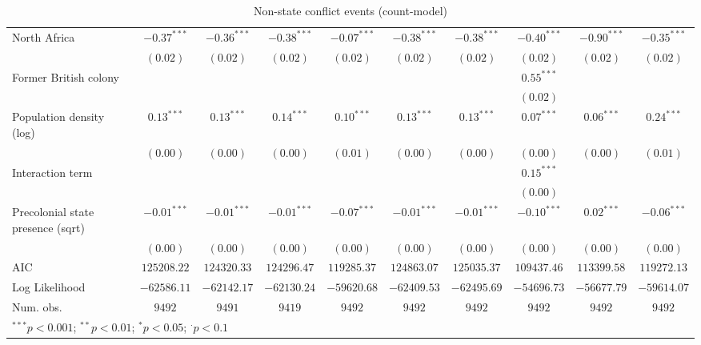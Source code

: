 \begin{sidewaystable}
\begin{center}
{\begin{tabular}{l c c c c c c c c c}
North Africa                          & $-0.37^{***}$ & $-0.36^{***}$ & $-0.38^{***}$ & $-0.07^{***}$ & $-0.38^{***}$ & $-0.38^{***}$ & $-0.40^{***}$ & $-0.90^{***}$ & $-0.35^{***}$ \\
                                      & $(0.02)$      & $(0.02)$      & $(0.02)$      & $(0.02)$      & $(0.02)$      & $(0.02)$      & $(0.02)$      & $(0.02)$      & $(0.02)$      \\
Former British colony                 &               &               &               &               &               &               & $0.55^{***}$  &               &               \\
                                      &               &               &               &               &               &               & $(0.02)$      &               &               \\
Population density (log)              & $0.13^{***}$  & $0.13^{***}$  & $0.14^{***}$  & $0.10^{***}$  & $0.13^{***}$  & $0.13^{***}$  & $0.07^{***}$  & $0.06^{***}$  & $0.24^{***}$  \\
                                      & $(0.00)$      & $(0.00)$      & $(0.00)$      & $(0.01)$      & $(0.00)$      & $(0.00)$      & $(0.00)$      & $(0.00)$      & $(0.01)$      \\
Interaction term                      &               &               &               &               &               &               & $0.15^{***}$  &               &               \\
                                      &               &               &               &               &               &               & $(0.00)$      &               &               \\
Precolonial state presence (sqrt)     & $-0.01^{***}$ & $-0.01^{***}$ & $-0.01^{***}$ & $-0.07^{***}$ & $-0.01^{***}$ & $-0.01^{***}$ & $-0.10^{***}$ & $0.02^{***}$  & $-0.06^{***}$ \\
                                      & $(0.00)$      & $(0.00)$      & $(0.00)$      & $(0.00)$      & $(0.00)$      & $(0.00)$      & $(0.00)$      & $(0.00)$      & $(0.00)$      \\
\midrule
AIC                                   & $125208.22$   & $124320.33$   & $124296.47$   & $119285.37$   & $124863.07$   & $125035.37$   & $109437.46$   & $113399.58$   & $119272.13$   \\
Log Likelihood                        & $-62586.11$   & $-62142.17$   & $-62130.24$   & $-59620.68$   & $-62409.53$   & $-62495.69$   & $-54696.73$   & $-56677.79$   & $-59614.07$   \\
Num. obs.                             & $9492$        & $9491$        & $9419$        & $9492$        & $9492$        & $9492$        & $9492$        & $9492$        & $9492$        \\
\bottomrule
\multicolumn{10}{l}{\scriptsize{$^{***}p<0.001$; $^{**}p<0.01$; $^{*}p<0.05$; $^{\cdot}p<0.1$}}
\end{tabular}
}
\caption{Non-state conflict events (count-model)}
\label{cznon_state}
\end{center}
\end{sidewaystable}
